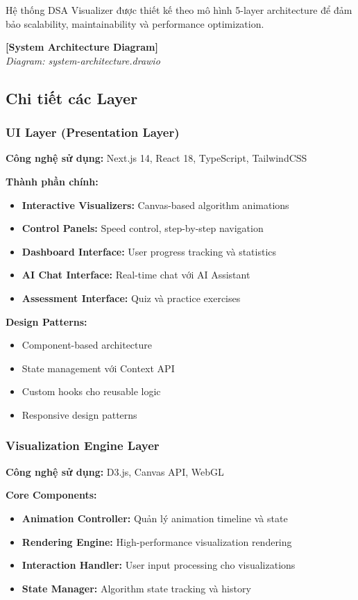 Hệ thống DSA Visualizer được thiết kế theo mô hình 5-layer architecture để đảm bảo scalability, maintainability và performance optimization.

\begin{center}
\textbf{[System Architecture Diagram]}\\
\textit{Diagram: system-architecture.drawio}
\end{center}

\subsection{Chi tiết các Layer}

\subsubsection{UI Layer (Presentation Layer)}
\textbf{Công nghệ sử dụng:} Next.js 14, React 18, TypeScript, TailwindCSS

\textbf{Thành phần chính:}
\begin{itemize}
    \item \textbf{Interactive Visualizers:} Canvas-based algorithm animations
    \item \textbf{Control Panels:} Speed control, step-by-step navigation
    \item \textbf{Dashboard Interface:} User progress tracking và statistics
    \item \textbf{AI Chat Interface:} Real-time chat với AI Assistant
    \item \textbf{Assessment Interface:} Quiz và practice exercises
\end{itemize}

\textbf{Design Patterns:}
\begin{itemize}
    \item Component-based architecture
    \item State management với Context API
    \item Custom hooks cho reusable logic
    \item Responsive design patterns
\end{itemize}

\subsubsection{Visualization Engine Layer}
\textbf{Công nghệ sử dụng:} D3.js, Canvas API, WebGL

\textbf{Core Components:}
\begin{itemize}
    \item \textbf{Animation Controller:} Quản lý animation timeline và state
    \item \textbf{Rendering Engine:} High-performance visualization rendering
    \item \textbf{Interaction Handler:} User input processing cho visualizations
    \item \textbf{State Manager:} Algorithm state tracking và history
\end{itemize}

